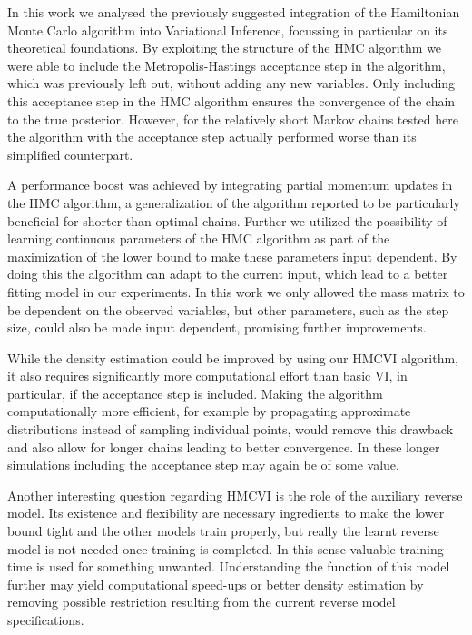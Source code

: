 \documentclass[12pt]{scrartcl}
\begin{document}
In this work we analysed the previously suggested integration of the Hamiltonian Monte Carlo algorithm into Variational Inference, focussing in particular on its theoretical foundations. By exploiting the structure of the HMC algorithm we were able to include the Metropolis-Hastings acceptance step in the algorithm, which was previously left out, without adding any new variables. Only including this acceptance step in the HMC algorithm ensures the convergence of the chain to the true posterior. However, for the relatively short Markov chains tested here the algorithm with the acceptance step actually performed worse than its simplified counterpart.

A performance boost was achieved by integrating partial momentum updates in the HMC algorithm, a generalization of the algorithm reported to be particularly beneficial for shorter-than-optimal chains. Further we utilized the possibility of learning continuous parameters of the HMC algorithm as part of the maximization of the lower bound to make these parameters input dependent. By doing this the algorithm can adapt to the current input, which lead to a better fitting model in our experiments. In this work we only allowed the mass matrix to be dependent on the observed variables, but other parameters, such as the step size, could also be made input dependent, promising further improvements.

While the density estimation could be improved by using our HMCVI algorithm, it also requires significantly more computational effort than basic VI, in particular, if the acceptance step is included. Making the algorithm computationally more efficient, for example by propagating approximate distributions instead of sampling individual points, would remove this drawback and also allow for longer chains leading to better convergence. In these longer simulations including the acceptance step may again be of some value.

Another interesting question regarding HMCVI is the role of the auxiliary reverse model. Its existence and flexibility are necessary ingredients to make the lower bound tight and the other models train properly, but really the learnt reverse model is not needed once training is completed. In this sense valuable training time is used for something unwanted. Understanding the function of this model further may yield computational speed-ups or better density estimation by removing possible restriction resulting from the current reverse model specifications.
\end{document}
